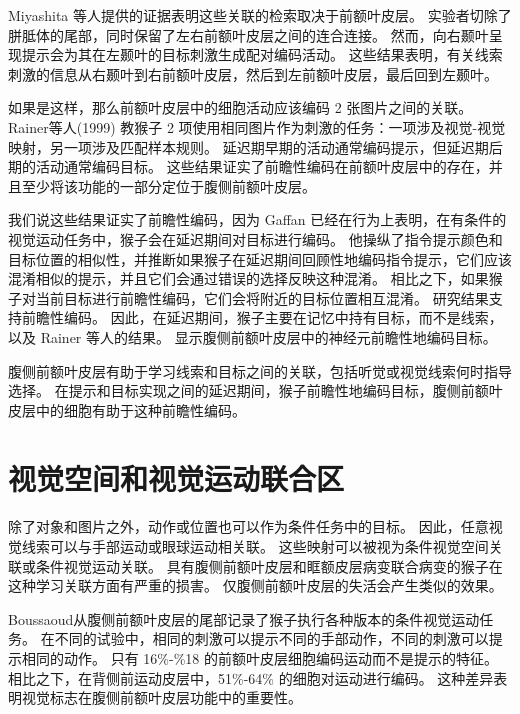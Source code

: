 Miyashita 等人\cite{miyashita2004cognitive}提供的证据表明这些关联的检索取决于前额叶皮层。
实验者切除了胼胝体的尾部，同时保留了左右前额叶皮层之间的连合连接\cite{tomita1999top}。
然而，向右颞叶呈现提示会为其在左颞叶的目标刺激生成配对编码活动。 
这些结果表明，有关线索刺激的信息从右颞叶到右前额叶皮层，然后到左前额叶皮层，最后回到左颞叶\cite{hasegawa1998callosal,tomita1999top}。
\par


如果是这样，那么前额叶皮层中的细胞活动应该编码 2 张图片之间的关联。 
Rainer等人(1999) 教猴子 2 项使用相同图片作为刺激的任务：一项涉及视觉-视觉映射，另一项涉及匹配样本规则。 
延迟期早期的活动通常编码提示，但延迟期后期的活动通常编码目标。 
这些结果证实了前瞻性编码在前额叶皮层中的存在，并且至少将该功能的一部分定位于腹侧前额叶皮层。
\par


我们说这些结果证实了前瞻性编码，因为 Gaffan\cite{gaffan1977response} 已经在行为上表明，在有条件的视觉运动任务中，猴子会在延迟期间对目标进行编码。 
他操纵了指令提示颜色和目标位置的相似性，并推断如果猴子在延迟期间回顾性地编码指令提示，它们应该混淆相似的提示，并且它们会通过错误的选择反映这种混淆。 
相比之下，如果猴子对当前目标进行前瞻性编码，它们会将附近的目标位置相互混淆。
研究结果支持前瞻性编码。 
因此，在延迟期间，猴子主要在记忆中持有目标，而不是线索，以及 Rainer 等人的结果。 
显示腹侧前额叶皮层中的神经元前瞻性地编码目标。
\par


腹侧前额叶皮层有助于学习线索和目标之间的关联，包括听觉或视觉线索何时指导选择。
在提示和目标实现之间的延迟期间，猴子前瞻性地编码目标，腹侧前额叶皮层中的细胞有助于这种前瞻性编码。



\section{视觉空间和视觉运动联合区}
\par

除了对象和图片之外，动作或位置也可以作为条件任务中的目标。 
因此，任意视觉线索可以与手部运动\cite{bussey2001role}或眼球运动\cite{asaad1998neural}相关联。 
这些映射可以被视为条件视觉空间关联或条件视觉运动关联。 
具有腹侧前额叶皮层和眶额皮层病变联合病变的猴子在这种学习关联方面有严重的损害\cite{bussey2001role}。 
仅腹侧前额叶皮层的失活会产生类似的效果\cite{wang2000deficit}。
\par


Boussaoud\cite{boussaoud1993primate}从腹侧前额叶皮层的尾部记录了猴子执行各种版本的条件视觉运动任务。 
在不同的试验中，相同的刺激可以提示不同的手部动作，不同的刺激可以提示相同的动作。
只有 16\%-\%18 的前额叶皮层细胞编码运动而不是提示的特征。
相比之下，在背侧前运动皮层中，51\%-64\% 的细胞对运动进行编码。 
这种差异表明视觉标志在腹侧前额叶皮层功能中的重要性。
\par


